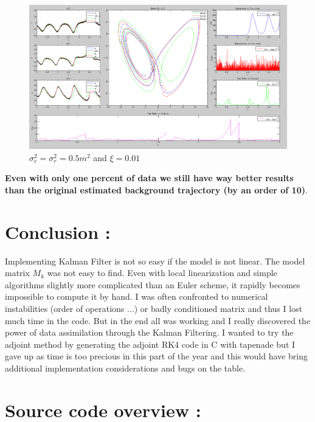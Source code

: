 \documentclass[11pt,a4paper]{article}
\begin{document}
\begin{figure}[H]
   \includegraphics[width=14cm]{Q12b.png}
   \caption{$\sigma_e^2 = \sigma_r^2 = 0.5m^2$ and $\xi = 0.01$}
\end{figure}

\textbf{Even with only one percent of data we still have way better results than the original estimated background trajectory (by an order of 10)}. 

\clearpage
\section {Conclusion :}

Implementing Kalman Filter is not so easy if the model is not linear. The model matrix $M_k$ was not easy to find. Even with local linearization and simple algorithms slightly more complicated than an Euler scheme, it rapidly becomes impossible to compute it by hand. I was often confronted to numerical instabilities (order of operations ...) or badly conditioned matrix and thus I lost much time in the code. But in the end all was working and I really discovered the power of data assimilation through the Kalman Filtering. I wanted to try the adjoint method by generating the adjoint RK4 code in C with tapenade but I gave up as time is too precious in this part of the year and this would have bring additional implementation considerations and bugs on the table.

\section {Source code overview :}
\end{document}
